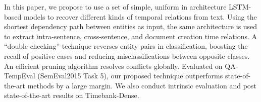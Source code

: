In this paper, we propose to use a set of simple, uniform in architecture LSTM-based models to recover different kinds of temporal relations from text. Using the shortest dependency path between entities as input, the same architecture is used to extract intra-sentence, cross-sentence, and document creation time relations. A ``double-checking'' technique reverses entity pairs in classification, boosting the recall of positive cases and reducing misclassifications between opposite classes. An efficient pruning algorithm resolves conflicts globally. Evaluated on QA-TempEval (SemEval2015 Task 5), our proposed technique outperforms state-of-the-art methods by a large margin. We also conduct intrinsic evaluation and post state-of-the-art results on Timebank-Dense.
